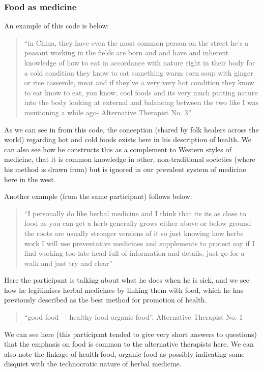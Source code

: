 \subsubsection{Food as medicine}



An example of this code is below:
\begin{quotation}
``in China, they have even the most common person on the street he's a peasant working in the fields are born and and have and inherent knowledge of how to eat in accordance with nature right in their body for a cold condition they know to eat something warm corn soup with ginger or rice casserole, meat and if they've a very very hot condition they know to eat know to eat, you know, cool foods and its very much putting nature into the body looking at external and balancing between the two like I was mentioning a while ago- Alternative Therapist No. 3''
  
\end{quotation}

As we can see in from this code, the conception (shared by folk healers across the world) regarding hot and cold foods exists here in his description of health. We can also see how he constructs this as a complement to Western styles of medicine, that it is common knowledge in other, non-traditional societies (where his method is drawn from) but is ignored in our prevalent system of medicine here in the west. 

Another example (from the same participant) follows below:
\begin{quotation}
``I personally do like herbal medicine and I think that its its as close to food as you can get a herb generally grows either above or below ground the roots are usually stronger versions of it so just knowing how herbs work I will use preventative medicines and supplements to protect say if I find working too late head full of information and details, just go for a walk and just try and clear''  
\end{quotation}


Here the participant is talking about what he does when he is sick, and we see how he legitimises herbal medicines by linking them with food, which he has previously described as the best method for promotion of health. 
\begin{quotation}
``good food –- healthy food organic food''. Alternative Therapist No. 1  
\end{quotation}

We can see here (this participant tended to give very short answers to questions) that the emphasis on food is common to the alternative therapists here. We can also note the linkage of health food, organic food as possibly indicating some disquiet with the technocratic nature of herbal medicine. 

